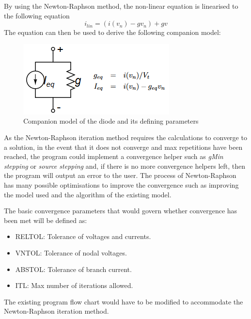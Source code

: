 \documentclass[12pt,a4paper]{article}
\begin{document}
By using the Newton-Raphson method, the non-linear equation is linearised to the following equation\cite{companion}
$$i_{lin} = (i(v_n)-gv_n) + gv$$
The equation can then be used to derive the following companion model:

\begin{figure} [h!]
	\centering
	\includegraphics[]{diode_model.PNG}
	\caption{Companion model of the diode and its defining parameters \cite{companion}}
\end{figure}
As the Newton-Raphson iteration method requires the calculations to converge to a solution, in the event that it does not
converge and max repetitions have been reached, the program could implement a convergence helper such as \textit{gMin stepping} or
\textit{source stepping} and, if there is no more convergence helpers left, then the program will output an error to the user.
The process of Newton-Raphson has many 
possible optimisations to improve the convergence such as improving the model used and the algorithm of the existing model.
\par 
The basic convergence parameters that would govern whether convergence has been met will be defined as:
\begin{itemize}
	\item RELTOL: Tolerance of voltages and currents.
	\item VNTOL: Tolerance of nodal voltages.
	\item ABSTOL: Tolerance of branch current.
	\item ITL: Max number of iterations allowed.
\end{itemize} 
The existing program flow chart would have to be modified to accommodate the Newton-Raphson iteration method. 
\end{document}
